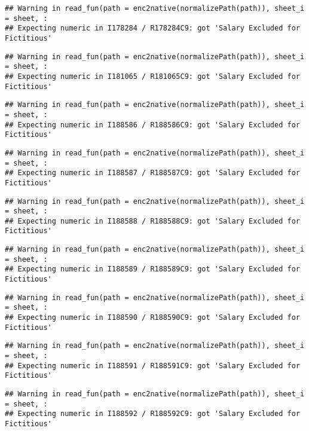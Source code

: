 \documentclass[
]{article}
\begin{document}
\begin{verbatim}
## Warning in read_fun(path = enc2native(normalizePath(path)), sheet_i = sheet, :
## Expecting numeric in I178284 / R178284C9: got 'Salary Excluded for Fictitious'
\end{verbatim}

\begin{verbatim}
## Warning in read_fun(path = enc2native(normalizePath(path)), sheet_i = sheet, :
## Expecting numeric in I181065 / R181065C9: got 'Salary Excluded for Fictitious'
\end{verbatim}

\begin{verbatim}
## Warning in read_fun(path = enc2native(normalizePath(path)), sheet_i = sheet, :
## Expecting numeric in I188586 / R188586C9: got 'Salary Excluded for Fictitious'
\end{verbatim}

\begin{verbatim}
## Warning in read_fun(path = enc2native(normalizePath(path)), sheet_i = sheet, :
## Expecting numeric in I188587 / R188587C9: got 'Salary Excluded for Fictitious'
\end{verbatim}

\begin{verbatim}
## Warning in read_fun(path = enc2native(normalizePath(path)), sheet_i = sheet, :
## Expecting numeric in I188588 / R188588C9: got 'Salary Excluded for Fictitious'
\end{verbatim}

\begin{verbatim}
## Warning in read_fun(path = enc2native(normalizePath(path)), sheet_i = sheet, :
## Expecting numeric in I188589 / R188589C9: got 'Salary Excluded for Fictitious'
\end{verbatim}

\begin{verbatim}
## Warning in read_fun(path = enc2native(normalizePath(path)), sheet_i = sheet, :
## Expecting numeric in I188590 / R188590C9: got 'Salary Excluded for Fictitious'
\end{verbatim}

\begin{verbatim}
## Warning in read_fun(path = enc2native(normalizePath(path)), sheet_i = sheet, :
## Expecting numeric in I188591 / R188591C9: got 'Salary Excluded for Fictitious'
\end{verbatim}

\begin{verbatim}
## Warning in read_fun(path = enc2native(normalizePath(path)), sheet_i = sheet, :
## Expecting numeric in I188592 / R188592C9: got 'Salary Excluded for Fictitious'
\end{verbatim}
\end{document}
